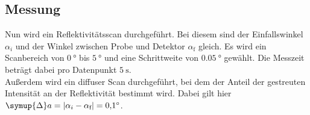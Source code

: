 \subsection{Messung}

Nun wird ein Reflektivitätsscan durchgeführt. Bei diesem sind der Einfallswinkel $\alpha_i$ und der Winkel zwischen Probe 
und Detektor $\alpha_\text{f}$ gleich. Es wird ein Scanbereich von $\SI{0}{\degree}$ bis $\SI{5}{\degree}$ und eine Schrittweite 
von $\SI{0.05}{\degree}$ gewählt. Die Messzeit beträgt dabei pro Datenpunkt $\SI{5}{\second}$. \\
Außerdem wird ein diffuser Scan durchgeführt, bei dem der Anteil der gestreuten Intensität an der Reflektivität bestimmt wird. Dabei
gilt hier $\symup{\Delta}a = \vert \alpha_i - \alpha_\text{f}\vert = \SI{0.1}{\degree}$.